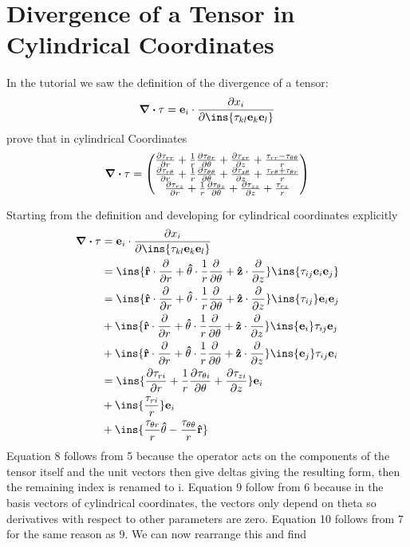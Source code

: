 \clearpage
\section{Divergence of a Tensor in Cylindrical Coordinates}
\begin{colbox}
	In the tutorial we saw the definition of the divergence of a tensor:
	\begin{equation}
		\div{\tau} = \vb{e}_i\cdot\pdv{x_i}\ins{\tau_{kl}\vb{e}_k\vb{e}_l}
	\end{equation}
	prove that in cylindrical Coordinates
	\begin{equation}
		\div\tau = \pmqty{\pdv{\tau_{rr}}{r}+\frac{1}{r}\pdv{\tau_{\theta r}}{\theta}+\pdv{\tau_{zr}}{z}+\frac{\tau_{rr}-\tau_{\theta\theta}}{r}\\
			\pdv{\tau_{r\theta}}{r}+\frac{1}{r}\pdv{\tau_{\theta\theta}}{\theta}+\pdv{\tau_{z\theta}}{z}+\frac{\tau_{r\theta}+\tau_{\theta r}}{r}\\ \pdv{\tau_{rz}}{r}+\frac{1}{r}\pdv{\tau_{\theta z}}{\theta}+\pdv{\tau_{zz}}{z}+\frac{\tau_{rz}}{r}}
	\end{equation}
\end{colbox}
Starting from the definition and developing for cylindrical coordinates explicitly
\begin{align}
	\div{\tau} &= \vb{e}_i\cdot\pdv{x_i}\ins{\tau_{kl}\vb{e}_k\vb{e}_l}\\
	&= \ins{\vu{r}\cdot\pdv{r}+\vu{\theta}\cdot\frac{1}{r}\pdv{\theta}+\vu{z}\cdot\pdv{z}}\ins{\tau_{ij}\vb{e}_i\vb{e}_j}\\
	&= \ins{\vu{r}\cdot\pdv{r}+\vu{\theta}\cdot\frac{1}{r}\pdv{\theta}+\vu{z}\cdot\pdv{z}}\ins{\tau_{ij}} \vb{e}_i \vb{e}_j \\	
	&+ \ins{\vu{r}\cdot\pdv{r}+\vu{\theta}\cdot\frac{1}{r}\pdv{\theta}+\vu{z}\cdot\pdv{z}}\ins{\vb{e}_i}\tau_{ij}\vb{e}_j \\ 
	&+ \ins{\vu{r}\cdot\pdv{r}+\vu{\theta}\cdot\frac{1}{r}\pdv{\theta}+\vu{z}\cdot\pdv{z}}\ins{\vb{e}_j}\tau_{ij}\vb{e}_i \\
	&= \ins{\pdv{\tau_{ri}}{r}+\frac{1}{r}\pdv{\tau_{\theta i}}{\theta}+\pdv{\tau_{zi}}{z}} \vb{e}_i\\
	&+ \ins{\frac{\tau_{ri}}{r}}\vb{e}_i \\
	&+ \ins{\frac{\tau_{\theta r}}{r}\vu{\theta}-\frac{\tau_{\theta\theta}}{r}\vu{r}}
\end{align}
Equation 8 follows from 5 because the operator acts on the components of the tensor itself and the unit vectors then give deltas giving the resulting form, then the remaining index is renamed to i. Equation 9 follow from 6 because in the basis vectors of cylindrical coordinates, the vectors only depend on theta so derivatives with respect to other parameters are zero. Equation 10 follows from 7 for the same reason as 9. We can now rearrange this and find
